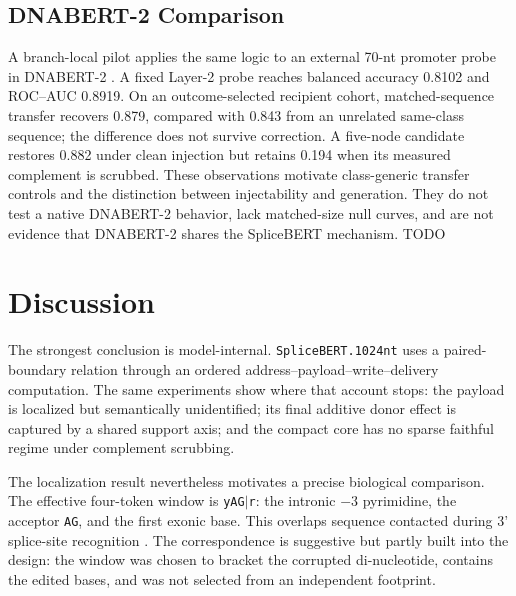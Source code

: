 \documentclass{article}
\begin{document}
\subsection{DNABERT-2 Comparison}
\label{sec:dnabert}

A branch-local pilot applies the same logic to an external 70-nt promoter probe in DNABERT-2 \citep{zhou2024dnabert2}. A fixed Layer-2 probe reaches balanced accuracy 0.8102 and ROC--AUC 0.8919. On an outcome-selected recipient cohort, matched-sequence transfer recovers 0.879, compared with 0.843 from an unrelated same-class sequence; the difference does not survive correction. A five-node candidate restores 0.882 under clean injection but retains 0.194 when its measured complement is scrubbed. These observations motivate class-generic transfer controls and the distinction between injectability and generation. They do not test a native DNABERT-2 behavior, lack matched-size null curves, and are not evidence that DNABERT-2 shares the SpliceBERT mechanism. TODO

\section{Discussion}
\label{sec:discussion}

The strongest conclusion is model-internal. \texttt{SpliceBERT.1024nt} uses a paired-boundary relation through an ordered address--payload--write--delivery computation. The same experiments show where that account stops: the payload is localized but semantically unidentified; its final additive donor effect is captured by a shared support axis; and the compact core has no sparse faithful regime under complement scrubbing.

The localization result nevertheless motivates a precise biological comparison. The effective four-token window is \texttt{yAG\(\vert\)r}: the intronic \(-3\) pyrimidine, the acceptor \texttt{AG}, and the first exonic base. This overlaps sequence contacted during 3' splice-site recognition \citep{zamore1989u2af,wu1999functional,smith1993scanning}. The correspondence is suggestive but partly built into the design: the window was chosen to bracket the corrupted di-nucleotide, contains the edited bases, and was not selected from an independent footprint. 
\end{document}

